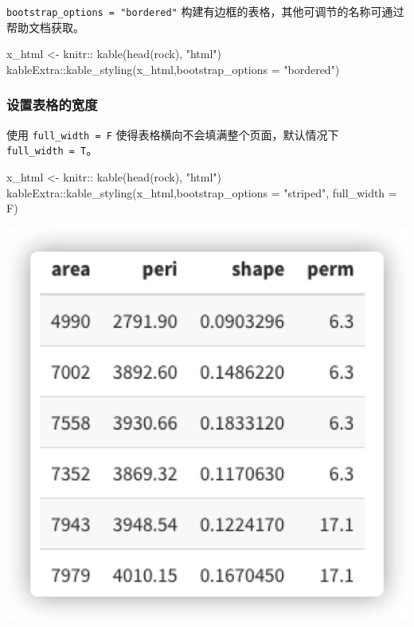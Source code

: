 \documentclass[
]{book}
\newenvironment{Shaded}{\begin{snugshade}}{\end{snugshade}}
\newcommand{\NormalTok}[1]{#1}
\begin{document}
\texttt{bootstrap\_options\ =\ "bordered"}
构建有边框的表格，其他可调节的名称可通过帮助文档获取。

\begin{Shaded}
\begin{Highlighting}[]
\NormalTok{x\_html \textless{}{-} knitr:: kable(head(rock), "html")}
\NormalTok{kableExtra::kable\_styling(x\_html,bootstrap\_options = "bordered")}
\end{Highlighting}
\end{Shaded}

\hypertarget{ux8bbeux7f6eux8868ux683cux7684ux5bbdux5ea6}{%
\subsubsection{设置表格的宽度}\label{ux8bbeux7f6eux8868ux683cux7684ux5bbdux5ea6}}

使用 \texttt{full\_width\ =\ F} 使得表格横向不会填满整个页面，默认情况下
\texttt{full\_width\ =\ T}。

\begin{Shaded}
\begin{Highlighting}[]
\NormalTok{x\_html \textless{}{-} knitr:: kable(head(rock), "html")}
\NormalTok{kableExtra::kable\_styling(x\_html,bootstrap\_options = "striped",}
\NormalTok{                          full\_width = F)}
\end{Highlighting}
\end{Shaded}

\includegraphics{images/paste-D4893CD0.png}
\end{document}
